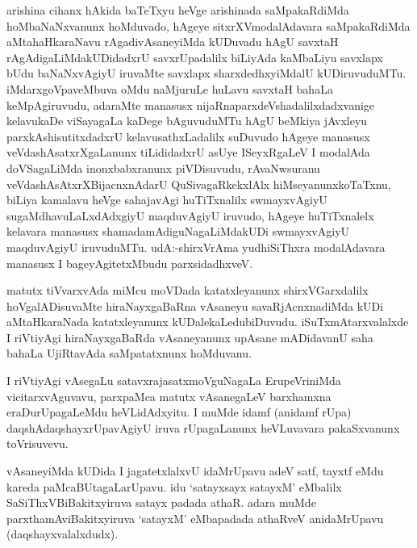 \centerline{}

\begin{artha}
arishina cihanx hAkida baTeTxyu heVge arishinada saMpakaRdiMda
hoMbaNaNxvanunx hoMduvado, hAgeye sitxrXVmodalAdavara saMpakaRdiMda
aMtahaHkaraNavu rAgadivAsaneyiMda kUDuvadu hAgU savxtaH
rAgAdigaLiMdakUDidadxrU savxrUpadalilx biLiyAda kaMbaLiyu savxlapx
bUdu baNaNxvAgiyU iruvaMte savxlapx sharxdedhxyiMdalU
kUDiruvuduMTu. iMdarxgoVpaveMbuva oMdu naMjuruLe huLavu savxtaH bahaLa
keMpAgiruvudu, adaraMte manasusx nijaRnaparxdeVshadalilxdadxvanige
kelavukaDe viSayagaLa kaDege bAguvuduMTu hAgU beMkiya jAvxleyu
parxkAshisutitxdadxrU kelavusathxLadalilx suDuvudo hAgeye manasusx
veVdashAsatxrXgaLanunx tiLididadxrU asUye ISeyxRgaLeV I modalAda
doVSagaLiMda inonxbabxranunx piVDisuvudu, rAvaNwsuranu
veVdashAsAtxrXBijacnxnAdarU QuSivagaRkekxlAlx hiMseyanunxkoTaTxnu,
biLiya kamalavu heVge sahajavAgi huTiTxnalilx swmayxvAgiyU
sugaMdhavuLaLxdAdxgiyU maqduvAgiyU iruvudo, hAgeye huTiTxnalelx
kelavara manasusx shamadamAdiguNagaLiMdakUDi swmayxvAgiyU maqduvAgiyU
iruvuduMTu. udA:-shirxVrAma yudhiSiThxra modalAdavara manasusx I
bageyAgitetxMbudu parxsidadhxveV.
\end{artha}

\begin{artha}
matutx tiVvarxvAda miMcu moVDada katatxleyanunx shirxVGarxdalilx
hoVgalADisuvaMte hiraNayxgaBaRna vAsaneyu savaRjAcnxnadiMda kUDi
aMtaHkaraNada katatxleyanunx kUDalekaLedubiDuvudu. iSuTxmAtarxvalalxde
I riVtiyAgi hiraNayxgaBaRda vAsaneyanunx upAsane mADidavanU saha
bahaLa UjiRtavAda saMpatatxnunx hoMduvanu.
\end{artha}

\begin{artha}
I riVtiyAgi vAsegaLu satavxrajasatxmoVguNagaLa ErupeVriniMda
vicitarxvAguvavu, parxpaMca matutx vAsanegaLeV barxhamxna
eraDurUpagaLeMdu heVLidAdxyitu. I muMde idamf (anidamf rUpa)
daqshAdaqshayxrUpavAgiyU iruva rUpagaLanunx heVLuvavara pakaSxvanunx toVrisuvevu.
\end{artha}

\centerline{}

\begin{artha}
 vAsaneyiMda kUDida I jagatetxlalxvU idaMrUpavu adeV satf, tayxtf eMdu kareda paMcaBUtagaLarUpavu. idu `satayxsayx satayxM' eMbalilx SaSiThxVBiBakitxyiruva satayx padada athaR. adara muMde parxthamAviBakitxyiruva `satayxM' eMbapadada athaRveV anidaMrUpavu (daqshayxvalalxdudx).
\end{artha}

